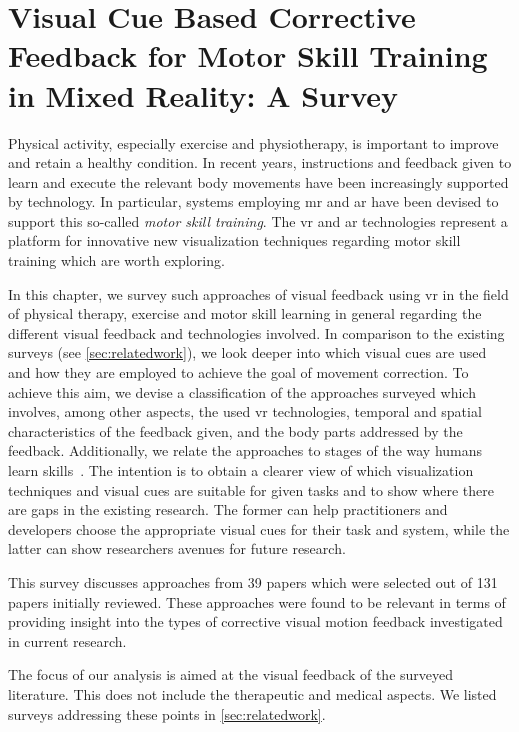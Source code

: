 
\chapter[Visual Cue Based Corrective Feedback for Motor Skill Training in Mixed Reality]{Visual Cue Based Corrective Feedback for Motor Skill Training in Mixed Reality: A Survey\label{chap:visualCueSurvey}}

Physical activity, especially exercise and physiotherapy, is important to improve and retain a healthy condition. In recent years, instructions and feedback given to learn and execute the relevant body movements have been increasingly supported by technology. In particular, systems employing \acrfull{mr} and \acrshort{ar} have been devised to support this so-called \emph{motor skill training}. The \acrshort{vr} and \acrshort{ar} technologies represent a platform for innovative new visualization techniques regarding motor skill training which are worth exploring.

In this chapter, we survey such approaches of visual feedback using \acrshort{vr} in the field of physical therapy, exercise and motor skill learning in general regarding the different visual feedback and technologies involved. In comparison to the existing surveys (see \autoref{sec:relatedwork}), we look deeper into which visual cues are used and how they are employed to achieve the goal of movement correction. To achieve this aim, we devise a classification of the approaches surveyed which involves, among other aspects, the used \acrshort{vr} technologies, temporal and spatial characteristics of the feedback given, and the body parts addressed by the feedback. Additionally, we relate the approaches to stages of the way humans learn skills~\cite{fitts1967HPe}. The intention is to obtain a clearer view of which visualization techniques and visual cues are suitable for given tasks and to show where there are gaps in the existing research. The former can help practitioners and developers choose the appropriate visual cues for their task and system, while the latter can show researchers avenues for future research. 

This survey discusses approaches from 39 papers which were selected
out of 131 papers initially reviewed. These approaches were found to be relevant in terms of providing insight into the types of corrective visual motion feedback investigated in current research.

The focus of our analysis is aimed at the visual feedback of the surveyed literature. This does not include the therapeutic and medical aspects. We listed surveys addressing these points in \autoref{sec:relatedwork}.

